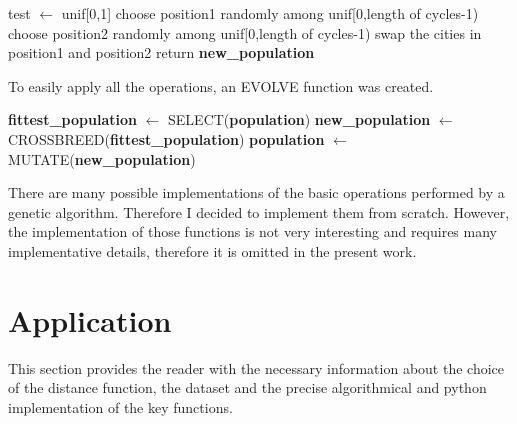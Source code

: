 \documentclass{article}
\begin{document}
\begin{algorithm}[H]
    \begin{algorithmic}[1]
        \State test $\leftarrow$ unif[0,1]
        	\State choose position1 randomly among unif[0,length of cycles-1)
  			\State choose position2 randomly among unif[0,length of cycles-1)
  			\State swap the cities in position1 and position2
        \EndIf
       \EndFor
        \State return \textbf{new\_population}
       \EndFunction
\end{algorithmic}
\end{algorithm}
\noindent To easily apply all the operations, an EVOLVE function was created.

\begin{algorithm}[H]
    \begin{algorithmic}[1]
        \State \textbf{fittest\_population} $\leftarrow$ SELECT(\textbf{population})
        \State \textbf{new\_population} $\leftarrow$ CROSSBREED(\textbf{fittest\_population})
       \State \textbf{population} $\leftarrow$ MUTATE(\textbf{new\_population})
       \EndFunction
\end{algorithmic}
\end{algorithm}

\noindent There are many possible implementations of the basic operations performed by a genetic algorithm. Therefore I decided to implement them from scratch. However, the implementation of those functions is not very interesting and requires many implementative details, therefore it is omitted in the present work.

\section{Application} 
This section provides the reader with the necessary information about the choice of the distance function, the dataset and the precise algorithmical and python implementation of the key functions.
\end{document}
